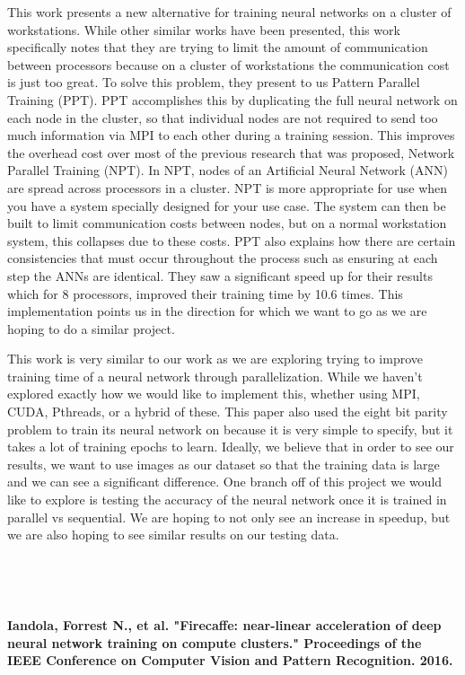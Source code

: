 \documentclass[11pt]{article}
\begin{document}
	This work presents a new alternative for training neural networks on a cluster of workstations. While other similar works have been presented, this work specifically notes that they are trying to limit the amount of communication between processors because on a cluster of workstations the communication cost is just too great. To solve this problem, they present to us Pattern Parallel Training (PPT). PPT accomplishes this by duplicating the full neural network on each node in the cluster, so that individual nodes are not required to send too much information via MPI to each other during a training session. This improves the overhead cost over most of the previous research that was proposed, Network Parallel Training (NPT). In NPT, nodes of an Artificial Neural Network (ANN) are spread across processors in a cluster. NPT is more appropriate for use when you have a system specially designed for your use case. The system can then be built to limit communication costs between nodes, but on a normal workstation system, this collapses due to these costs. PPT also explains how there are certain consistencies that must occur throughout the process such as ensuring at each step the ANNs are identical. They saw a significant speed up for their results which for 8 processors, improved their training time by 10.6 times. This implementation points us in the direction for which we want to go as we are hoping to do a similar project.
	
	This work is very similar to our work as we are exploring trying to improve training time of a neural network through parallelization. While we haven’t explored exactly how we would like to implement this, whether using MPI, CUDA, Pthreads, or a hybrid of these. This paper also used the eight bit parity problem to train its neural network on because it is very simple to specify, but it takes a lot of training epochs to learn. Ideally, we believe that in order to see our results, we want to use images as our dataset so that the training data is large and we can see a significant difference. One branch off of this project we would like to explore is testing the accuracy of the neural network once it is trained in parallel vs sequential. We are hoping to not only see an increase in speedup, but we are also hoping to see similar results on our testing data. 


\

\

\noindent \textbf{ Iandola, Forrest N., et al. "Firecaffe: near-linear acceleration of deep neural network training on compute clusters." Proceedings of the IEEE Conference on Computer Vision and Pattern Recognition. 2016.}
\end{document}
